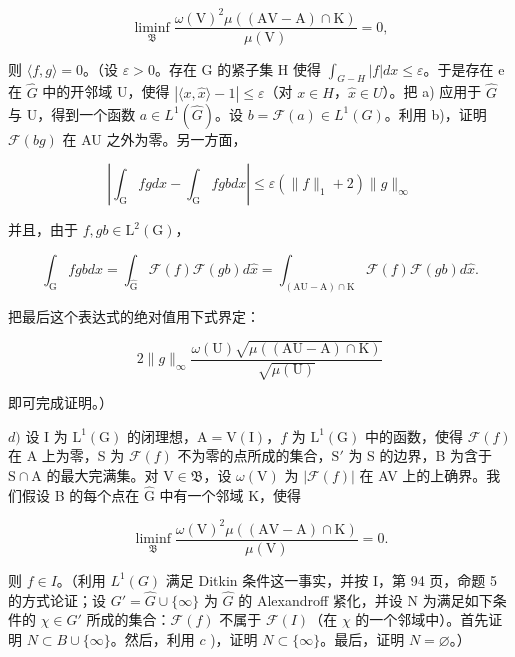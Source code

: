 \[
\operatorname * {l i m i n f} _ {\mathfrak {B}} \frac {\omega (\mathrm{V}) ^ {2} \mu ((\mathrm{AV} - \mathrm{A}) \cap \mathrm{K})}{\mu (\mathrm{V})} = 0,
\]

则 \(\langle f,g\rangle=0\)。（设 \(\varepsilon>0\)。存在 G 的紧子集 H 使得 \(\int_{G-H}|f|dx\leqslant\varepsilon\)。于是存在 e 在 \(\widehat{G}\) 中的开邻域 U，使得 \(|\langle x,\widehat{x}\rangle-1|\leqslant\varepsilon\)（对 \(x\in H\)，\(\widehat{x}\in U\)）。把 a) 应用于 \(\widehat{G}\) 与 U，得到一个函数 \(a\in L^{1}(\widehat{G})\)。设 \(b=\mathcal{F}(a)\in L^{1}(G)\)。利用 b)，证明 \(\mathcal{F}(bg)\) 在 AU 之外为零。另一方面，

\[
\left| \int_ {\mathrm{G}} f g d x - \int_ {\mathrm{G}} f g b d x \right| \leqslant \varepsilon (\| f \| _ {1} + 2) \| g \| _ {\infty}
\]

并且，由于 \(f, gb \in \mathrm{L}^{2}(\mathrm{G})\)，

\[
\int_ {\mathrm{G}} f g b d x = \int_ {\widehat {\mathrm{G}}} \mathcal {F} (f) \mathcal {F} (g b) d \widehat {x} = \int_ {(\mathrm{AU-A}) \cap \mathrm{K}} \mathcal {F} (f) \mathcal {F} (g b) d \widehat {x}.
\]

把最后这个表达式的绝对值用下式界定：

\[
2 \| g \| _ {\infty} \frac {\omega (\mathrm{U}) \sqrt {\mu ((\mathrm{AU} - \mathrm{A}) \cap \mathrm{K})}}{\sqrt {\mu (\mathrm{U})}}
\]

即可完成证明。）

\(d)\) 设 I 为 \(\mathrm{L}^1 (\mathrm{G})\) 的闭理想，\(\mathrm{A} = \mathrm{V}(\mathrm{I})\)，\(f\) 为 \(\mathrm{L}^1 (\mathrm{G})\) 中的函数，使得 \(\mathcal{F}(f)\) 在 A 上为零，S 为 \(\mathcal{F}(f)\) 不为零的点所成的集合，\(\mathrm{S}'\) 为 S 的边界，B 为含于 \(\mathrm{S} \cap \mathrm{A}\) 的最大完满集。对 \(\mathrm{V} \in \mathfrak{B}\)，设 \(\omega (\mathrm{V})\) 为 \(|\mathcal{F}(f)|\) 在 AV 上的上确界。我们假设 B 的每个点在 \(\widehat{\mathrm{G}}\) 中有一个邻域 K，使得

\[
\operatorname * {l i m i n f} _ {\mathfrak {B}} \frac {\omega (\mathrm{V}) ^ {2} \mu ((\mathrm{AV-A}) \cap \mathrm{K})}{\mu (\mathrm{V})} = 0.
\]

则 \(f \in I\)。（利用 \(L^1(G)\) 满足 Ditkin 条件这一事实，并按 I，第 94 页，命题 5 的方式论证；设 \(G' = \widehat{G} \cup \{\infty\}\) 为 \(\widehat{G}\) 的 Alexandroff 紧化，并设 N 为满足如下条件的 \(\chi \in G'\) 所成的集合：\(\mathcal{F}(f)\) 不属于 \(\mathcal{F}(I)\)（在 \(\chi\) 的一个邻域中）。首先证明 \(N \subset B \cup \{\infty\}\)。然后，利用 \(c\) )，证明 \(N \subset \{\infty\}\)。最后，证明 \(N = \varnothing\)。）

